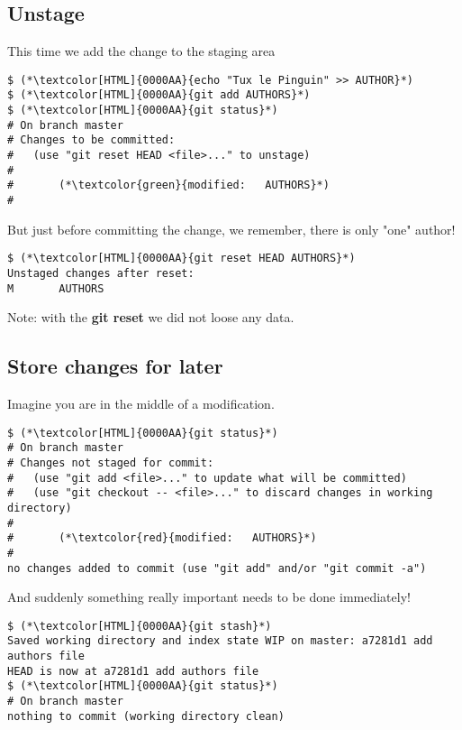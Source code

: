 \subsection{Unstage}
\begin{frame}[fragile]
\subslidetitle

This time we add the change to the staging area

\begin{lstlisting}
$ (*\textcolor[HTML]{0000AA}{echo "Tux le Pinguin" >> AUTHOR}*)
$ (*\textcolor[HTML]{0000AA}{git add AUTHORS}*)
$ (*\textcolor[HTML]{0000AA}{git status}*)
# On branch master
# Changes to be committed:
#   (use "git reset HEAD <file>..." to unstage)
#
#       (*\textcolor{green}{modified:   AUTHORS}*)
#
\end{lstlisting}

But just before committing the change, we remember, there is only "one" author!

\begin{lstlisting}
$ (*\textcolor[HTML]{0000AA}{git reset HEAD AUTHORS}*)
Unstaged changes after reset:
M       AUTHORS
\end{lstlisting}

Note: with the \textbf{git reset} we did not loose any data.

\end{frame}

\subsection{Store changes for later}
\begin{frame}[fragile]
\subslidetitle

Imagine you are in the middle of a modification.

\begin{lstlisting}
$ (*\textcolor[HTML]{0000AA}{git status}*)
# On branch master
# Changes not staged for commit:
#   (use "git add <file>..." to update what will be committed)
#   (use "git checkout -- <file>..." to discard changes in working directory)
#
#       (*\textcolor{red}{modified:   AUTHORS}*)
#
no changes added to commit (use "git add" and/or "git commit -a")
\end{lstlisting}

And suddenly something really important needs to be done immediately!

\begin{lstlisting}
$ (*\textcolor[HTML]{0000AA}{git stash}*)
Saved working directory and index state WIP on master: a7281d1 add authors file
HEAD is now at a7281d1 add authors file
$ (*\textcolor[HTML]{0000AA}{git status}*)
# On branch master
nothing to commit (working directory clean)
\end{lstlisting}
\end{frame}


